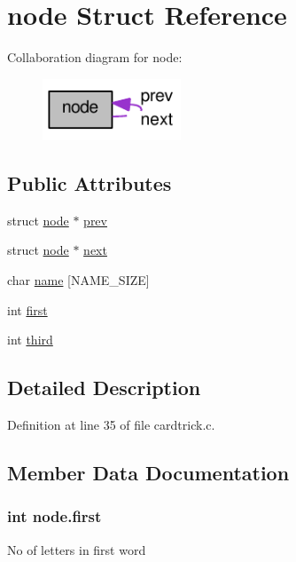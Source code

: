 \hypertarget{structnode}{
\section{node Struct Reference}
\label{structnode}
}


Collaboration diagram for node:\nopagebreak
\begin{figure}[H]
\begin{center}
\leavevmode
\includegraphics[width=117pt]{structnode__coll__graph}
\end{center}
\end{figure}
\subsection*{Public Attributes}
\begin{DoxyCompactItemize}
\item 
struct \hyperlink{structnode}{node} $\ast$ \hyperlink{structnode_a23dd2ff244acbbf20ec4408f81d76d9c}{prev}
\item 
struct \hyperlink{structnode}{node} $\ast$ \hyperlink{structnode_ad465c36cd29be2935f9e1bee1a3eaa03}{next}
\item 
char \hyperlink{structnode_af67fef838619da259b5c424c8fe5f718}{name} \mbox{[}NAME\_\-SIZE\mbox{]}
\item 
int \hyperlink{structnode_a972b8b8be90e29c40676be5d34ad3b1d}{first}
\item 
int \hyperlink{structnode_ae9b51f363ea789f5f6ec2fbc0b2a8086}{third}
\end{DoxyCompactItemize}


\subsection{Detailed Description}


Definition at line 35 of file cardtrick.c.



\subsection{Member Data Documentation}
\hypertarget{structnode_a972b8b8be90e29c40676be5d34ad3b1d}{
\subsubsection[{first}]{\setlength{\rightskip}{0pt plus 5cm}int {\bf node.first}}}
\label{structnode_a972b8b8be90e29c40676be5d34ad3b1d}
No of letters in first word 

